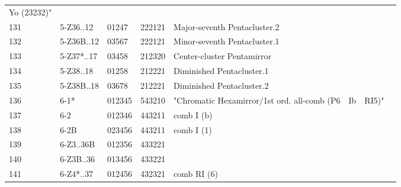 \begin{table}[h]
\begin{tabular}{lllll}
Yo (23232)"            &                     &         &           &                                                            &                             &                   &      &     \\
131                    & 5-Z36..12           & 01247   & 222121    & Major-seventh Pentacluster.2                               &                             &                   &      &     \\
132                    & 5-Z36B..12          & 03567   & 222121    & Minor-seventh Pentacluster.1                               &                             &                   &      &     \\
133                    & 5-Z37*..17          & 03458   & 212320    & Center-cluster Pentamirror                                 &                             &                   &      &     \\
134                    & 5-Z38..18           & 01258   & 212221    & Diminished Pentacluster.1                                  &                             &                   &      &     \\
135                    & 5-Z38B..18          & 03678   & 212221    & Diminished Pentacluster.2                                  &                             &                   &      &     \\
136                    & 6-1*                & 012345  & 543210    & "Chromatic Hexamirror/1st ord. all-comb (P6                & Ib                          & RI5)"             &      &     \\
137                    & 6-2                 & 012346  & 443211    & comb I (b)                                                 &                             &                   &      &     \\
138                    & 6-2B                & 023456  & 443211    & comb I (1)                                                 &                             &                   &      &     \\
139                    & 6-Z3..36B           & 012356  & 433221    &                                                            &                             &                   &      &     \\
140                    & 6-Z3B..36           & 013456  & 433221    &                                                            &                             &                   &      &     \\
141                    & 6-Z4*..37           & 012456  & 432321    & comb RI (6)                                                &                             &                   &      &     \\

\end{tabular}
\end{table}
